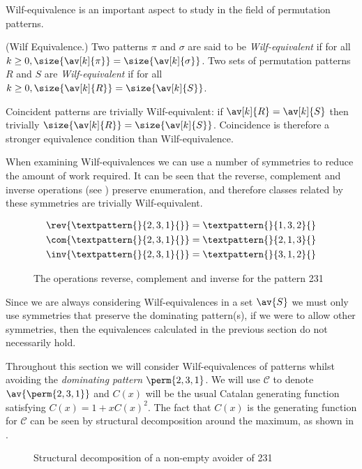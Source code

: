 Wilf-equivalence is an important aspect to study in the field of permutation
patterns.

\begin{definition}{(Wilf Equivalence.)}
  Two patterns \(\pi\) and \(\sigma\) are said to be \emph{Wilf-equivalent}
  if for all \(k\ge0, \size{\av[k]{\pi}} = \size{\av[k]{\sigma}}\). Two sets of
  permutation patterns \(R\) and \(S\) are \emph{Wilf-equivalent} if for all
  \(k\ge0, \size{\av[k]{R}} = \size{\av[k]{S}}\).
\end{definition}

Coincident patterns are trivially Wilf-equivalent: if \(\av[k]{R} = \av[k]{S}\)
then trivially \(\size{\av[k]{R}} = \size{\av[k]{S}}\). Coincidence is
therefore a stronger equivalence condition than Wilf-equivalence.

When examining Wilf-equivalences we can use a number of symmetries to reduce
the amount of work required. It can be seen that the reverse, complement
and inverse operations (see ) preserve enumeration, and
therefore classes related by these symmetries are trivially
Wilf-equivalent.
\begin{figure}[!htb]
\begin{align*}
    \rev{\textpattern{}{2,3,1}{}} &= \textpattern{}{1,3,2}{}\\
    \com{\textpattern{}{2,3,1}{}} &= \textpattern{}{2,1,3}{}\\
    \inv{\textpattern{}{2,3,1}{}} &= \textpattern{}{3,1,2}{}
\end{align*}
\caption{The operations reverse, complement and inverse for the pattern 231}
\label{fig:symm}
\end{figure}

Since we are always considering Wilf-equivalences in a set \(\av{S}\) we
must only use symmetries that preserve the dominating pattern(s), if we
were to allow other symmetries, then the equivalences calculated in the
previous section do not necessarily hold.

Throughout this section we will consider Wilf-equivalences of patterns
whilst avoiding the \emph{dominating pattern} \(\perm{2,3,1}\). We will
use \(\mathcal{C}\) to denote \(\av{\perm{2,3,1}}\) and \(C(x)\) will
be the usual Catalan generating function satisfying \(C(x) = 1 + xC(x)^2\).
The fact that \(C(x)\) is the generating function for \(\mathcal{C}\)
can be seen by structural decomposition around the maximum, as
shown in .

\begin{figure}[!ht]
    \centering
    \caption{Structural decomposition of a non-empty avoider of 231}
    \label{fig:decompmax}
\end{figure}

